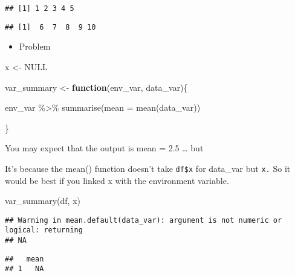 \documentclass[
]{book}
\newenvironment{Shaded}{\begin{snugshade}}{\end{snugshade}}
\newcommand{\AttributeTok}[1]{\textcolor[rgb]{0.77,0.63,0.00}{#1}}
\newcommand{\ConstantTok}[1]{\textcolor[rgb]{0.00,0.00,0.00}{#1}}
\newcommand{\ControlFlowTok}[1]{\textcolor[rgb]{0.13,0.29,0.53}{\textbf{#1}}}
\newcommand{\FunctionTok}[1]{\textcolor[rgb]{0.00,0.00,0.00}{#1}}
\newcommand{\NormalTok}[1]{#1}
\newcommand{\OtherTok}[1]{\textcolor[rgb]{0.56,0.35,0.01}{#1}}
\newcommand{\SpecialCharTok}[1]{\textcolor[rgb]{0.00,0.00,0.00}{#1}}
\providecommand{\tightlist}{%
  \setlength{\itemsep}{0pt}\setlength{\parskip}{0pt}}
\begin{document}
\begin{verbatim}
## [1] 1 2 3 4 5
\end{verbatim}

\begin{Shaded}
\end{Shaded}

\begin{verbatim}
## [1]  6  7  8  9 10
\end{verbatim}

\begin{itemize}
\tightlist
\item
  Problem
\end{itemize}

\begin{Shaded}
\begin{Highlighting}[]
\NormalTok{x }\OtherTok{\textless{}{-}} \ConstantTok{NULL} 

\NormalTok{var\_summary }\OtherTok{\textless{}{-}} \ControlFlowTok{function}\NormalTok{(env\_var, data\_var)\{}
 
\NormalTok{   env\_var }\SpecialCharTok{\%\textgreater{}\%}
    \FunctionTok{summarise}\NormalTok{(}\AttributeTok{mean =} \FunctionTok{mean}\NormalTok{(data\_var))}

\NormalTok{\}}
\end{Highlighting}
\end{Shaded}

You may expect that the output is mean = 2.5 \ldots{} but

It's because the mean() function doesn't take \texttt{df\$x} for data\_var but \texttt{x.} So it would be best if you linked x with the environment variable.

\begin{Shaded}
\begin{Highlighting}[]
\FunctionTok{var\_summary}\NormalTok{(df, x)}
\end{Highlighting}
\end{Shaded}

\begin{verbatim}
## Warning in mean.default(data_var): argument is not numeric or logical: returning
## NA
\end{verbatim}

\begin{verbatim}
##   mean
## 1   NA
\end{verbatim}
\end{document}
